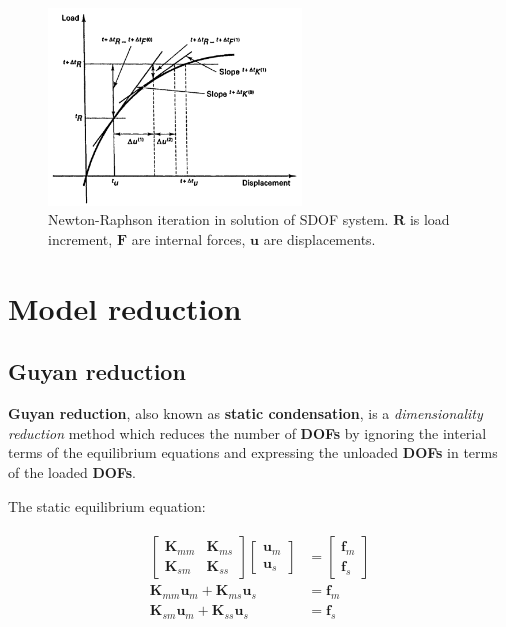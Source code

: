 \documentclass[10pt,b5paper,titlepage]{book}
\newcommand{\m}{\mathbf}
\newenvironment{eqarray}
{
    \begin{eqnarray}
        \begin{aligned}
}
{
        \end{aligned}
    \end{eqnarray}
}
\begin{document}
\begin{figure}[ht]
    \centering
    \includegraphics[width=0.60\textwidth]{img/full_newton_raphson.png}
    \caption{Newton-Raphson iteration in solution of SDOF system.
    $ \m{R} $ is load increment, $ \m{F} $ are internal forces,
    $ \m{u} $ are displacements.}
    \label{fig:full-newton-raphson-png}
\end{figure}







\newpage
\chapter{Model reduction}

\section{Guyan reduction}
\textbf{Guyan reduction}, also known as \textbf{static condensation},
is a \textit{dimensionality reduction} method which reduces the number
of \textbf{DOFs} by ignoring the interial terms of the equilibrium equations
and expressing the unloaded \textbf{DOFs} in terms of the loaded \textbf{DOFs}.

The static equilibrium equation:

\begin{eqarray}
    \begin{bmatrix}
        \m{K}_{mm} & \m{K}_{ms} \\
        \m{K}_{sm} & \m{K}_{ss}
    \end{bmatrix}
    \begin{bmatrix}
        \m{u}_m \\
        \m{u}_s
    \end{bmatrix} &=
    \begin{bmatrix}
        \m{f}_m \\
        \m{f}_s
    \end{bmatrix} \\
    \m{K}_{mm} \m{u}_m + \m{K}_{ms} \m{u}_s &= \m{f}_m \\
    \m{K}_{sm} \m{u}_m + \m{K}_{ss} \m{u}_s &= \m{f}_s
\end{eqarray}
\end{document}

